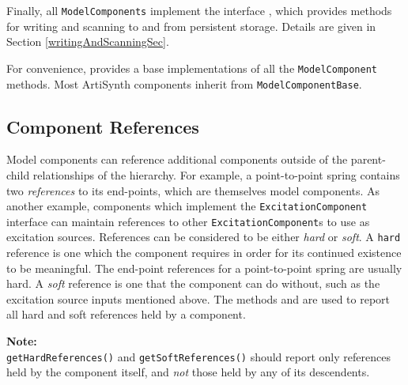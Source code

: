 \documentclass{article}
\begin{document}
Finally, all {\tt ModelComponents} implement the interface
, which provides methods for
writing and scanning to and from persistent storage.  Details are
given in Section \ref{writingAndScanningSec}.

For convenience,
 provides a
base implementations of all the {\tt ModelComponent} methods.  Most
ArtiSynth components inherit from {\tt ModelComponentBase}.

\subsection{Component References}
\label{ComponentReferencesSec}

Model components can reference additional components outside of the
parent-child relationships of the hierarchy. For example, a
point-to-point spring contains two {\it references} to its end-points,
which are themselves model components. As another example, components
which implement the {\tt ExcitationComponent} interface can maintain
references to other {\tt ExcitationComponent}s to use as excitation
sources. References can be considered to be either {\it hard} or {\it
soft}. A {\tt hard} reference is one which the component requires in
order for its continued existence to be meaningful. The end-point
references for a point-to-point spring are usually hard. A {\it soft}
reference is one that the component can do without, such as the
excitation source inputs mentioned above. The methods
and
are used to report all hard and soft references held by a component.

\begin{sideblock}
{\bf Note:}\\
{\tt getHardReferences()} and {\tt getSoftReferences()} should report
only references held by the component itself, and {\it not} those held
by any of its descendents.
\end{sideblock}
\end{document}
